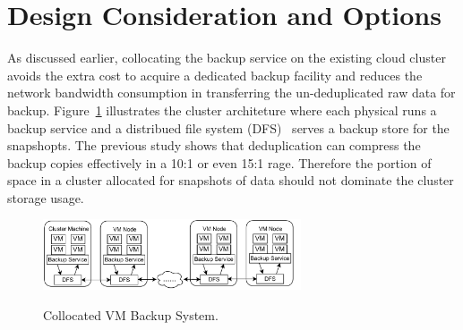 \section{Design Consideration and Options}
\label{sect:options}

As discussed earlier, collocating the backup service on the existing
cloud cluster avoids the extra cost to acquire a dedicated backup facility
and reduces the network bandwidth consumption in transferring the un-deduplicated
raw data for backup. 
Figure~\ref{fig:collocated} illustrates the cluster architeture where
each physical runs a backup service and a distribued file system (DFS)~\cite{GFS2004,Hadoop} 
serves a backup store  for the snapshopts.
The previous study shows that 
 deduplication can compress the backup copies 
effectively in a 10:1 or even 15:1 rage. 
Therefore  the portion of space in a cluster
allocated for snapshots of data should not dominate
the cluster storage usage.





\begin{figure}[htb]
    \centering
    \includegraphics[width=3in]{images/colocated-arch.pdf}
    \label{fig:collocated}
    \caption{Collocated VM Backup System.}
\end{figure}



